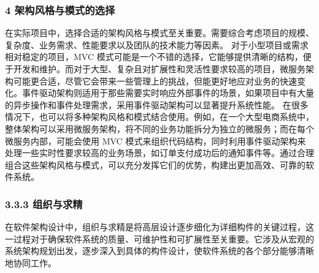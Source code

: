 \subsubsection{4 架构风格与模式的选择}\label{ux67b6ux6784ux98ceux683cux4e0eux6a21ux5f0fux7684ux9009ux62e9}
在实际项目中，选择合适的架构风格与模式至关重要。需要综合考虑项目的规模、复杂度、业务需求、性能要求以及团队的技术能力等因素。 对于小型项目或需求相对稳定的项目，MVC
模式可能是一个不错的选择，它能够提供清晰的结构，便于开发和维护。而对于大型、复杂且对扩展性和灵活性要求较高的项目，微服务架构可能更合适，尽管它会带来一些管理上的挑战，但能更好地应对业务的快速变化。事件驱动架构则适用于那些需要实时响应外部事件的场景，如果项目中有大量的异步操作和事件处理需求，采用事件驱动架构可以显著提升系统性能。
在很多情况下，也可以将多种架构风格和模式结合使用。例如，在一个大型电商系统中，整体架构可以采用微服务架构，将不同的业务功能拆分为独立的微服务；而在每个微服务内部，可能会使用 MVC
模式来组织代码结构，同时利用事件驱动架构来处理一些实时性要求较高的业务场景，如订单支付成功后的通知事件等。通过合理组合这些架构风格与模式，可以充分发挥它们的优势，构建出更加高效、可靠的软件系统。 \subsubsection{3.3.3
组织与求精}\label{ux7ec4ux7ec7ux4e0eux6c42ux7cbe}
在软件架构设计中，组织与求精是将高层设计逐步细化为详细构件的关键过程，这一过程对于确保软件系统的质量、可维护性和可扩展性至关重要。它涉及从宏观的系统架构规划出发，逐步深入到具体的构件设计，使软件系统的各个部分能够清晰地协同工作。
